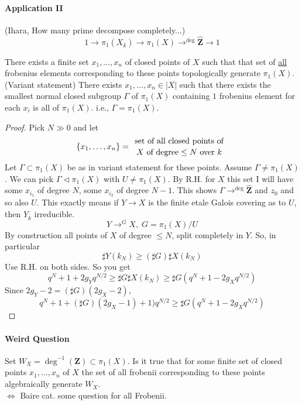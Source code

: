 \paragraph{Application II}(Ihara, How many prime decompose completely...)
	$$1\to \pi_1(X_{\overline k})\to \pi_1(X)\to^{\deg}\widehat{\mathbf{Z}}\to 1$$
	\begin{proposition}
	There exists a finite set $x_1, \ldots, x_n$ of closed points of $X$ such that that set of \underline{all} frobenius elements corresponding to these points topologically generate $\pi_1(X)$. \\
	
\noindent
	(Variant statement) There exists $x_1, \ldots, x_n\in |X|$ such that there exists the smallest normal closed subgroup $\Gamma$ of $\pi_1(X)$ containing $1$ frobenius element for each $x_i$ is all of $\pi_1(X)$. i.e., $\Gamma=\pi_1(X)$.
	\end{proposition}
\begin{proof} Pick $N\gg 0$ and let 
	$$\left\{x_1, \ldots, x_n\right\}={\text{ set of all closed points of }\atop X\text{ of degree} \leq N\text{ over } k}$$
	Let $\Gamma\subset \pi_1(X)$ be as in variant statement for these points. Assume $\Gamma\neq \pi_1(X)$. We can pick $\Gamma\lhd \pi_1(X)$ with $U\neq \pi_1(X)$. By R.H. for $X$ this set I will have some $x_{i_1}$ of degree $N$, some $x_{i_2}$ of degree $N-1$. This shows $\Gamma\to^{\deg}\widehat{\mathbf{Z}}$ and $z_0$ and so also $U$. This exactly means if $Y\to X$ is the finite etale Galois covering as to $U$, then $Y_{\overline k}$ irreducible. 
		$$Y\to^G X, \; G = \pi_1(X)/U$$
		By construction all points of $X$ of degree $\leq N$, split completely in $Y$. So, in particular 
			$$\sharp Y(k_N)\geq (\sharp G)\sharp X(k_N)$$
			Use R.H. on both sides. So you get
		$$q^N+1+2g_Yq^{N/2}\geq \sharp G\sharp X(k_N)\geq \sharp G(q^N+1-2g_Xq^{N/2})$$
		Since $2g_Y-2 = (\sharp G)(2g_X-2)$, 
		$$q^N+1+(\sharp G)(2g_X-1)+1)q^{N/2}\geq \sharp G(q^N+1-2g_Xq^{N/2})$$
\end{proof}	

\paragraph{Weird Question} Set $W_X = \deg^{-1}(\mathbf{Z})\subset \pi_1(X)$. Is it true that for some finite set of closed points $x_1, \ldots, x_n$ of $X$ the set of all frobenii corresponding to these points algebraically generate $W_X$. \\
$\iff$ Baire cat. some question for all Frobenii. 

